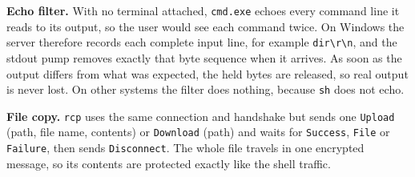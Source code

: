 \textbf{Echo filter.} With no terminal attached, \texttt{cmd.exe} echoes every
command line it reads to its output, so the user would see each command twice.
On Windows the server therefore records each complete input line, for example
\texttt{dir\textbackslash r\textbackslash n}, and the stdout pump removes
exactly that byte sequence when it arrives. As soon as the output differs from
what was expected, the held bytes are released, so real output is never lost.
On other systems the filter does nothing, because \texttt{sh} does not echo.

\textbf{File copy.} \texttt{rcp} uses the same connection and handshake but
sends one \texttt{Upload} (path, file name, contents) or \texttt{Download}
(path) and waits for \texttt{Success}, \texttt{File} or \texttt{Failure},
then sends \texttt{Disconnect}. The whole file travels in one encrypted
message, so its contents are protected exactly like the shell traffic.
